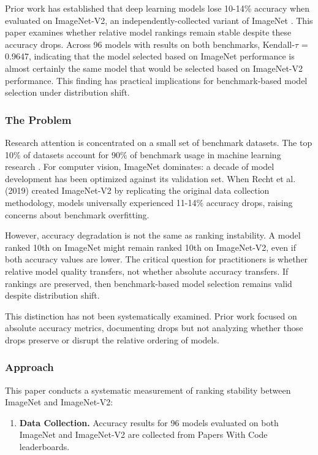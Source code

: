
Prior work has established that deep learning models lose 10-14\% accuracy when evaluated on ImageNet-V2, an independently-collected variant of ImageNet \citep{recht2019imagenet}. This paper examines whether relative model rankings remain stable despite these accuracy drops. Across 96 models with results on both benchmarks, Kendall-$\tau$ = 0.9647, indicating that the model selected based on ImageNet performance is almost certainly the same model that would be selected based on ImageNet-V2 performance. This finding has practical implications for benchmark-based model selection under distribution shift.

\subsubsection{The Problem}

Research attention is concentrated on a small set of benchmark datasets. The top 10\% of datasets account for 90\% of benchmark usage in machine learning research \citep{koch2021reduced}. For computer vision, ImageNet dominates: a decade of model development has been optimized against its validation set. When Recht et al. (2019) created ImageNet-V2 by replicating the original data collection methodology, models universally experienced 11-14\% accuracy drops, raising concerns about benchmark overfitting.

However, accuracy degradation is not the same as ranking instability. A model ranked 10th on ImageNet might remain ranked 10th on ImageNet-V2, even if both accuracy values are lower. The critical question for practitioners is whether relative model quality transfers, not whether absolute accuracy transfers. If rankings are preserved, then benchmark-based model selection remains valid despite distribution shift.

This distinction has not been systematically examined. Prior work focused on absolute accuracy metrics, documenting drops but not analyzing whether those drops preserve or disrupt the relative ordering of models.

\subsubsection{Approach}

This paper conducts a systematic measurement of ranking stability between ImageNet and ImageNet-V2:

\begin{enumerate}
\item \textbf{Data Collection.} Accuracy results for 96 models evaluated on both ImageNet and ImageNet-V2 are collected from Papers With Code leaderboards.
\end{enumerate}

